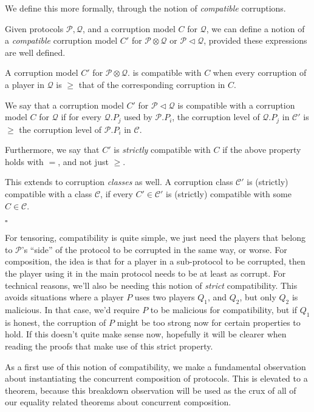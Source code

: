 We define this more formally, through the notion of \emph{compatible}
corruptions.

\begin{definition}
  \label{def:compatc}
  Given protocols $\mathscr{P}, \mathscr{Q}$, and a corruption model
  $C$ for $\mathscr{Q}$, we can define a notion of a \emph{compatible}
  corruption model $C'$ for $\mathscr{P} \otimes \mathscr{Q}$ or $\mathscr{P} \lhd \mathscr{Q}$,
  provided these expressions are well defined.

  A corruption model $C'$ for $\mathscr{P} \otimes \mathscr{Q}$.
  is compatible with $C$ when every corruption of a player
  in $\mathscr{Q}$ is $\geq$ that of the corresponding corruption in $C$.

  We say that a corruption model $C'$ for $\mathscr{P} \lhd \mathscr{Q}$ is compatible with
a corruption model $C$ for $\mathscr{Q}$ if for every
$\mathscr{Q}.P_j$ used by $\mathscr{P}.P_i$, the corruption
level of $\mathscr{Q}.P_j$ in $\mathscr{C}'$ is $\geq$ the corruption level of $\mathscr{P}.P_i$
in $\mathscr{C}$.

  Furthermore, we say that $C'$ is \emph{strictly} compatible
  with $C$ if the above property holds with $=$, and not just $\geq$.

  This extends to corruption \emph{classes} as well.
  A corruption class $\mathscr{C}'$ is (strictly) compatible with a class $\mathscr{C}$,
  if every $C' \in \mathscr{C}'$ is (strictly) compatible with some $C \in \mathscr{C}$.

  $\square$
\end{definition}

For tensoring, compatibility is quite simple, we just need the players
that belong to $\mathscr{P}$'s ``side'' of the protocol
to be corrupted in the same way, or worse.
For composition, the idea is that for a player in a sub-protocol
to be corrupted, then the player using it in the main protocol
needs to be at least as corrupt.
For technical reasons, we'll also be needing
this notion of \emph{strict} compatibility.
This avoids situations where a player $P$ uses two players $Q_1$,
and $Q_2$, but only $Q_2$ is malicious.
In that case, we'd require $P$ to be malicious for compatibility,
but if $Q_1$ is honest, the corruption of $P$
might be too strong now for certain properties to hold.
If this doesn't quite make sense now, hopefully it will
be clearer when reading the proofs that make use of this strict
property.

As a first use of this notion of compatibility, we make
a fundamental observation about instantiating the concurrent composition
of protocols.
This is elevated to a theorem, because this breakdown observation
will be used as the crux of all of our equality related theorems about concurrent
composition.

